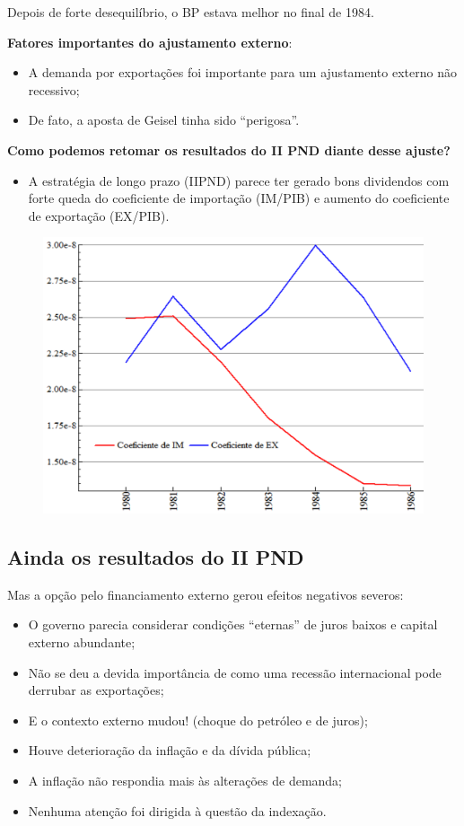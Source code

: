 \documentclass[a4paper,12pt]{article}[abntex2]
\begin{document}
Depois de forte desequilíbrio, o BP estava melhor no final de 1984.

\textbf{Fatores importantes do ajustamento externo}:
\begin{itemize}
    \item A demanda por exportações foi importante para um ajustamento externo não recessivo;
    \item De fato, a aposta de Geisel tinha sido “perigosa”.
\end{itemize}

\textbf{Como podemos retomar os resultados do II PND diante desse ajuste?}
\begin{itemize}
    \item A estratégia de longo prazo (IIPND) parece ter gerado bons dividendos com forte queda do coeficiente de importação (IM/PIB) e aumento do coeficiente de exportação (EX/PIB).
\end{itemize}

\begin{figure}[H]
    \centering
    \includegraphics[width=0.7\linewidth]{Imagens/a9i1.png}
\end{figure}

\subsection{\textbf{Ainda os resultados do II PND}}

Mas a opção pelo financiamento externo gerou efeitos negativos severos:
\begin{itemize}
    \item O governo parecia considerar condições “eternas” de juros baixos e capital externo abundante;
    \item Não se deu a devida importância de como uma recessão internacional pode derrubar as exportações;
    \item E o contexto externo mudou! (choque do petróleo e de juros);
    \item Houve deterioração da inflação e da dívida pública;
    \item A inflação não respondia mais às alterações de demanda;
    \item Nenhuma atenção foi dirigida à questão da indexação.
\end{itemize}
\end{document}
